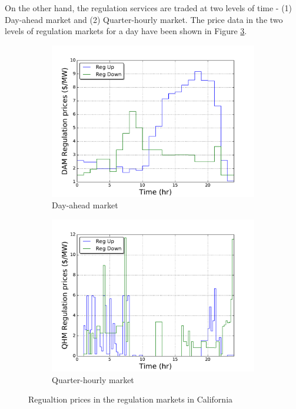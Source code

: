 \documentclass[11pt,twoside]{article}
\begin{document}
On the other hand, the regulation services are traded at two levels of time - (1) Day-ahead market and (2) Quarter-hourly market. The price data in the two levels of regulation markets for a day have been shown in Figure \ref{regprices}.
\begin{figure}[h!tp]
\centering
\begin{subfigure}[b]{0.49\textwidth} \includegraphics[width=\textwidth]{Figures/DAM_Reg_Price.pdf}\caption{Day-ahead market}\label{damregprices} \end{subfigure} \hfill
\begin{subfigure}[b]{0.49\textwidth} \includegraphics[width=\textwidth]{Figures/QHM_Reg_Price.pdf}\caption{Quarter-hourly market}\label{qhmregprices} \end{subfigure}
\caption{Regualtion prices in the regulation markets in California}\label{regprices}
\end{figure}
\end{document}
